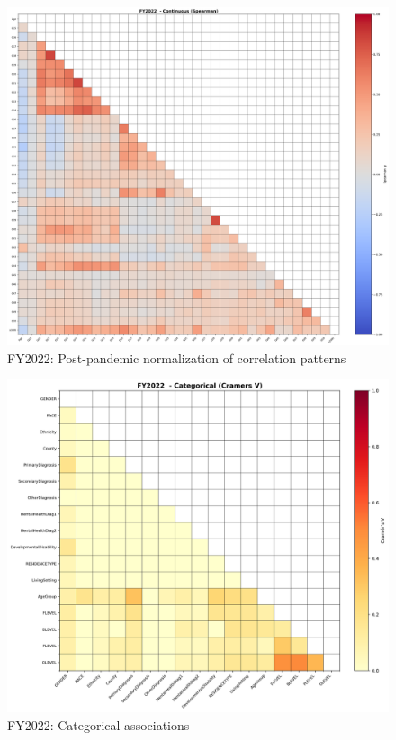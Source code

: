 \vspace*{\fill}
\begin{figure}[htbp]
\centering
\includegraphics[width=\textwidth]{fy2022_continuous_spearman.png}
\caption{FY2022: Post-pandemic normalization of correlation patterns}
\end{figure}
\vspace*{\fill}

\newpage

\vspace*{\fill}
\begin{figure}[htbp]
\centering
\includegraphics[width=\textwidth]{fy2022_categorical_cramers_v.png}
\caption{FY2022: Categorical associations}
\end{figure}
\vspace*{\fill}

